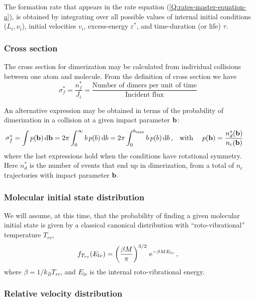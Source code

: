The formation rate that appears in the rate equation (\ref{Q:rates-master-equation-a}), is obtained by integrating over all possible values of internal initial conditions ($L_{i},\nu_{i}$), initial velocities $v_{i}$, excess-energy $\varepsilon^{*}$, and time-duration (or life) $\tau$.
\subsubsection{Cross section}
\label{S:cross-section}

The cross section for dimerization may be calculated from individual collisions between one atom and molecule. 
From the definition of cross section we have
\begin{equation*}
  \sigma_{f}^{*} = \frac{n_{f}^{*}}{J_{i}}= \frac{\text{Number of dimers per unit of time}}{\text{Incident flux}}
\end{equation*}

An alternative expression may be obtained in terms of the probability of dimerization in a collision at a given impact parameter $\mathbf{b}$:
\begin{align}
  \label{Q:rates-def-probab}
  \sigma_{f}^{*} = \int p(\mathbf{b})\,\mathrm{d} \mathbf{b} = 2 \pi \int_{0}^{\infty} b \, p(b) \,\mathrm{d} b = 2 \pi \int_{0}^{b_{\text{max}}} b \, p(b) \,\mathrm{d} b\,, & \quad \text{with } \quad  p(\mathbf{b}) = \frac{n_{d}^{*}(\mathbf{b})}{n_{c}(\mathbf{b})}
\end{align}
where the last expressions hold when the conditions have rotational symmetry. Here $n_{d}^{*}$ is the number of events that end up in dimerization, from a total of $n_{c}$ trajectories with impact parameter $\mathbf{b}$.

\subsubsection{Molecular initial state distribution}

We will assume, at this time, that the probability of finding a given molecular initial state is given by a classical canonical distribution with ``roto-vibrational'' temperature $T_{rv}$,
\begin{equation}
  \label{Q:rates-rotovib-distrib}
  f_{T_{rv}}(E_{l\nu}) = \left( \frac{\beta M}{\pi} \right)^{3/2} \, \mathrm{e}^{- \beta M E_{l\nu}} \,,
\end{equation}
where $\beta= 1/k_{B}T_{rv}$, and $E_{l\nu}$ is the internal roto-vibrational energy.

\subsubsection{Relative velocity distribution}

